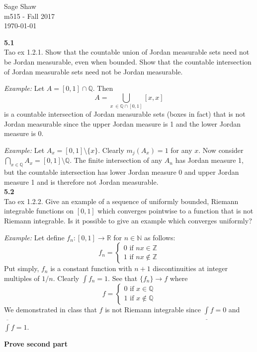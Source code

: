 \documentclass[12pt]{article}
\newcommand{\problem}[1]{\hspace{-4 ex} \large \textbf{#1}\\}
\begin{document}
	\thispagestyle{empty}
	
	\begin{flushright}
		Sage Shaw \\
		m515 - Fall 2017 \\
		\today
	\end{flushright}
	

\problem{5.1} Tao ex 1.2.1. Show that the countable union of Jordan measurable sets need not be Jordan measurable, even when bounded. Show that the countable intersection of Jordan measurable sets need not be Jordan measurable.

	\textit{Example:} Let $A = [0,1] \cap \mathbb{Q}$. Then $$A = \bigcup\limits_{x\ \in \mathbb{Q} \cap [0,1]}[x,x]$$ is a countable intersection of Jordan measurable sets (boxes in fact) that is not Jordan measurable since the upper Jordan measure is 1 and the lower Jordan measure is 0. \bigbreak

	\textit{Example:} Let $A_x = [0,1]\setminus\{x\}$. Clearly $m_j(A_x)=1$ for any $x$. Now consider $\bigcap\limits_{x \in \mathbb{Q}}A_x = [0,1] \setminus \mathbb{Q}$. The finite intersection of any $A_n$ has Jordan measure 1, but the countable intersection has lower Jordan measure 0 and upper Jordan measure 1 and is therefore not Jordan measurable.\\
	
	
\problem{5.2} Tao ex 1.2.2. Give an example of a sequence of uniformly bounded, Riemann integrable functions on $[0,1]$ which converges pointwise to a function that is not Riemann integrable. Is it possible to give an example which converges uniformly?

	\textit{Example:} Let define $f_n:[0,1] \to \mathbb{R}$ for $n \in \mathbb{N}$ as follows: 
	\[
		f_n = 
			\begin{cases}
				0 \text{ if } nx \in \mathbb{Z} \\
				1 \text{ if } nx \notin \mathbb{Z}
			\end{cases}
	\]
	Put simply, $f_n$ is a constant function with $n+1$ discontinuities at integer multiples of $1/n$. Clearly $\int f_n = 1$. See that $\{f_n\} \to f$ where
	\[
		f = 
			\begin{cases}
				0 \text{ if } x \in \mathbb{Q} \\
				1 \text{ if } x \notin \mathbb{Q}
			\end{cases}
	\]
	We demonstrated in class that $f$ is not Riemann integrable since $\underline{\int} f = 0$ and $\overline {\int} f = 1$.
	
	\textbf{Prove second part}
\end{document}
